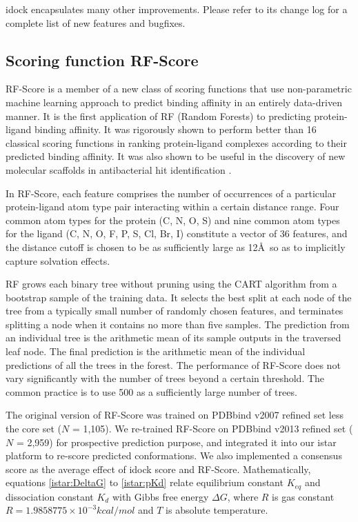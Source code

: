 idock encapsulates many other improvements. Please refer to its change log for a complete list of new features and bugfixes.

\subsection{Scoring function RF-Score}

RF-Score \citep{564} is a member of a new class of scoring functions that use non-parametric machine learning approach to predict binding affinity in an entirely data-driven manner. It is the first application of RF (Random Forests) \citep{1309} to predicting protein-ligand binding affinity. It was rigorously shown \citep{564} to perform better than 16 classical scoring functions in ranking protein-ligand complexes according to their predicted binding affinity. It was also shown to be useful in the discovery of new molecular scaffolds in antibacterial hit identification \citep{1281}.

In RF-Score, each feature comprises the number of occurrences of a particular protein-ligand atom type pair interacting within a certain distance range. Four common atom types for the protein (C, N, O, S) and nine common atom types for the ligand (C, N, O, F, P, S, Cl, Br, I) constitute a vector of 36 features, and the distance cutoff is chosen to be as sufficiently large as 12\AA\ so as to implicitly capture solvation effects.

RF grows each binary tree without pruning using the CART algorithm \citep{1310} from a bootstrap sample of the training data. It selects the best split at each node of the tree from a typically small number of randomly chosen features, and terminates splitting a node when it contains no more than five samples. The prediction from an individual tree is the arithmetic mean of its sample outputs in the traversed leaf node. The final prediction is the arithmetic mean of the individual predictions of all the trees in the forest. The performance of RF-Score does not vary significantly with the number of trees beyond a certain threshold. The common practice is to use 500 as a sufficiently large number of trees.

The original version of RF-Score \citep{564} was trained on PDBbind v2007 refined set less the core set ($N$ = 1,105). We re-trained RF-Score on PDBbind v2013 refined set ($N$ = 2,959) for prospective prediction purpose, and integrated it into our istar platform to re-score predicted conformations. We also implemented a consensus score as the average effect of idock score and RF-Score. Mathematically, equations \eqref{istar:DeltaG} to \eqref{istar:pKd} relate equilibrium constant $K_{eq}$ and dissociation constant $K_d$ with Gibbs free energy $\Delta G$, where $R$ is gas constant $R = 1.9858775 \times 10^{-3} kcal/mol$ and $T$ is absolute temperature.

